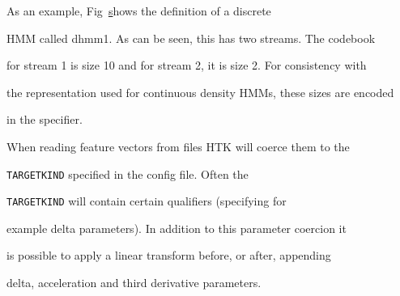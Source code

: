 As an example, Fig~\href{f:dischmm} shows the definition of a  discrete


HMM called \textsf{dhmm1}.  As can be seen, this has two streams.  The codebook


for stream 1 is size 10 and for stream 2, it is size 2.  For consistency with


the representation used for continuous density HMMs, these sizes are encoded 


in the  specifier.










When reading feature vectors from files HTK will coerce them to the


\texttt{TARGETKIND} specified in the config file. Often the


\texttt{TARGETKIND} will contain certain qualifiers (specifying for


example delta parameters). In addition to this parameter coercion it


is possible to apply a linear transform before, or after, appending


delta, acceleration and third derivative parameters.







